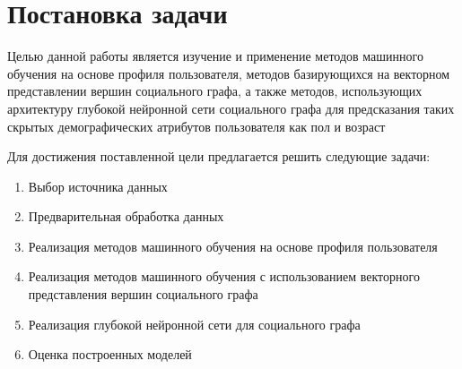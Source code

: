 \section{Постановка задачи}

Целью данной работы является изучение и применение методов машинного обучения на основе профиля пользователя, методов базирующихся на векторном представлении вершин социального графа, а также методов, использующих архитектуру глубокой нейронной сети социального графа для предсказания таких скрытых демографических атрибутов пользователя как пол и возраст 

Для достижения поставленной цели предлагается решить следующие задачи:

\begin{enumerate}
\item Выбор источника данных
\item Предварительная обработка данных
\item Реализация методов машинного обучения на основе профиля пользователя
\item Реализация методов машинного обучения с использованием векторного представления вершин социального графа
\item Реализация глубокой нейронной сети для социального графа
\item Оценка построенных моделей
\end{enumerate}

\clearpage
